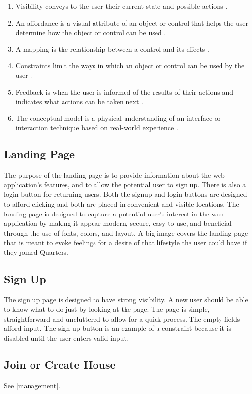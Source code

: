 \documentclass[12pt]{article}
\begin{document}
\begin{enumerate}
\item Visibility conveys to the user their current state and possible actions \cite{norman}.
\item An affordance is a visual attribute of an object or control that helps the user determine how the object or control can be used \cite{norman}.
\item A mapping is the relationship between a control and its effects \cite{norman}.
\item Constraints limit the ways in which an object or control can be used by the user \cite{norman}.
\item Feedback is when the user is informed of the results of their actions and indicates what actions can be taken next \cite{norman}.
\item The conceptual model is a physical understanding of an interface or interaction technique based on real-world experience \cite{norman}. 
\end{enumerate}

\subsection{Landing Page}
The purpose of the landing page is to provide information about the web application's features, and to allow the potential user to sign up. There is also a login button for returning users. Both the signup and login buttons are designed to afford clicking and both are placed in convenient and visible locations. The landing page is designed to capture a potential user's interest in the web application by making it appear modern, secure, easy to use, and beneficial through the use of fonts, colors, and layout. A big image covers the landing page that is meant to evoke feelings for a desire of that lifestyle the user could have if they joined Quarters.

\subsection{Sign Up}
The sign up page is designed to have strong visibility. A new user should be able to know what to do just by looking at the page. The page is simple, straightforward and uncluttered to allow for a quick process. The empty fields afford input. The sign up button is an example of a constraint because it is disabled until the user enters valid input.

\subsection{Join or Create House}
See \ref{management}. 
\end{document}

